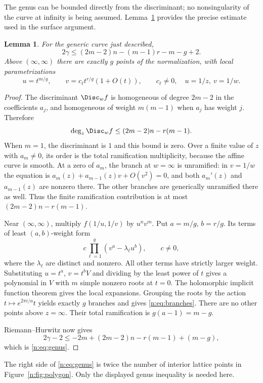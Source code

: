 \documentclass[UTF8,11pt]{ctexart}
\newtheorem{lem}[thm]{Lemma}
\theoremstyle{definition}
\numberwithin{equation}{section}
\begin{document}
The genus can be bounded directly from the discriminant; no nonsingularity
of the curve at infinity is being assumed. Lemma~\ref{n:lem:genus} provides the
precise estimate used in the surface argument.
\begin{lem}\label{n:lem:genus}
For the generic curve just described,
\begin{equation}\label{n:eq:genus}
 2\gamma\le(2m-2)n-(m-1)r-m-g+2.
\end{equation}
Above $(\infty,\infty)$ there are exactly $g$ points of the normalization,
with local parametrizations
\begin{equation}\label{n:eq:branches}
 u=t^{m/g},\qquad v=c_\ell t^{r/g}(1+O(t)),\qquad c_\ell\ne0,
 \quad u=1/z,\ v=1/w.
\end{equation}
\end{lem}
\begin{proof}
The discriminant $\Disc_w f$ is homogeneous of degree $2m-2$ in the
coefficients $a_j$, and homogeneous of weight $m(m-1)$ when $a_j$ has
weight $j$. Therefore
\[
 \deg_z\Disc_w f\le (2m-2)n-r(m-1).
\]
When $m=1$, the discriminant is $1$ and this bound is zero.
Over a finite value of $z$ with $a_m\ne0$, its order is the total
ramification multiplicity, because the affine curve is smooth. At a zero
of $a_m$, the branch at $w=\infty$ is unramified: in $v=1/w$ the equation
is $a_m(z)+a_{m-1}(z)v+O(v^2)=0$, and both $a_m'(z)$ and $a_{m-1}(z)$
are nonzero there. The other branches are generically unramified there
as well. Thus the finite ramification contribution is at most
$(2m-2)n-r(m-1)$.

Near $(\infty,\infty)$, multiply $f(1/u,1/v)$ by $u^nv^m$.
Put $a=m/g$, $b=r/g$. Its terms of least $(a,b)$-weight form
\[
 c\prod_{\ell=1}^g(v^a-\lambda_\ell u^b),
 \qquad c\ne0,
\]
where the $\lambda_\ell$ are distinct and nonzero. All other terms have
strictly larger weight. Substituting $u=t^a$, $v=t^bV$ and dividing by the
least power of $t$ gives a polynomial in $V$ with $m$ simple nonzero roots
at $t=0$. The holomorphic implicit function theorem gives the local
expansions. Grouping the roots by the action $t\mapsto e^{2\pi i/a}t$
yields exactly $g$ branches and gives \eqref{n:eq:branches}.
There are no other points above $z=\infty$. Their total ramification is
$g(a-1)=m-g$.

Riemann--Hurwitz now gives
\[
 2\gamma-2\le-2m+(2m-2)n-r(m-1)+(m-g),
\]
which is \eqref{n:eq:genus}.
\end{proof}

The right side of \eqref{n:eq:genus} is twice the number of interior lattice
points in Figure~\ref{n:fig:polygon}. Only the displayed genus inequality is needed here.
\end{document}
